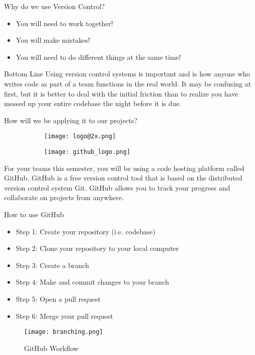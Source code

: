 \documentclass{beamer}
\begin{document}
\begin{frame}{Why do we use Version Control?}

\begin{itemize}
    \item You will need to work together!
    \item You will make mistakes!
    \item You will need to do different things at the same time!
\end{itemize}

\vskip 1cm
    
\begin{block}{Bottom Line}
Using version control systems is important and is how anyone who writes code as part of a team functions in the real world. It may be confusing at first, but it is better to deal with the initial friction than to realize you have messed up your entire codebase the night before it is due.
\end{block}

\end{frame}

\begin{frame}{How will we be applying it to our projects?}

\begin{figure}
\centering
\begin{subfigure}{\textwidth}
  \centering
  \texttt{[image: logo@2x.png]}
\end{subfigure}%
\begin{subfigure}{\textwidth}
  \centering
  \texttt{[image: github\_logo.png]}
\end{subfigure}
\end{figure}

\begin{block}{}
For your teams this semester, you will be using a code hosting platform called GitHub. GitHub is a free version control tool that is based on the distributed version control system Git. GitHub allows you to track your progress and collaborate on projects from anywhere.
\end{block} 
\end{frame}

\begin{frame}{How to use GitHub}
\begin{itemize}
    \item Step 1: Create your repository (i.e. codebase)
    \item Step 2: Clone your repository to your local computer
    \item Step 3: Create a branch
    \item Step 4: Make and commit changes to your branch
    \item Step 5: Open a pull request
    \item Step 6: Merge your pull request
\end{itemize}
\begin{figure}
\texttt{[image: branching.png]}
\caption{\label{fig:your-figure}GitHub Workflow}
\end{figure}
\end{frame}
\end{document}
